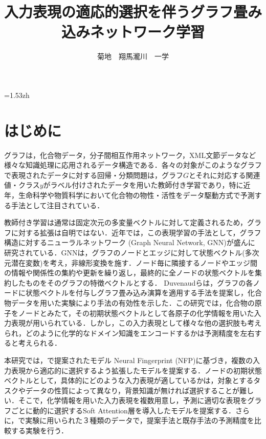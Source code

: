 \documentclass[twocolumn]{jarticle}
\title{\vspace{-4pt}\Large\gt 入力表現の適応的選択を伴うグラフ畳み込みネットワーク学習}
\author{菊地　翔馬\DAG \quad 瀧川　一学\DAG\DDAG\DDDAG\DDDDAG}
\affiliation{\normalsize \DAG 北海道大学大学院情報科学研究科 \quad \DDAG 北海道大学化学反応創成研究拠点\quad \DDDAG 理研AIP \quad \DDDDAG JSTさきがけ}
\begin{document}
\maketitle
\makeetitle   
\baselineskip=1.53zh 

\vspace{-5pt}

\fontsize{9pt}{12pt}\selectfont

\section{はじめに}
グラフは，化合物データ，分子間相互作用ネットワーク，XML文節データなど様々な知識処理に応用されるデータ構造である．各々の対象がこのようなグラフで表現されたデータに対する回帰・分類問題は，グラフ$G$とそれに対応する関連値・クラス$y$がラベル付けされたデータを用いた教師付き学習であり，特に近年，生命科学や物質科学において化合物の物性・活性をデータ駆動方式で予測する手法として注目されている．

教師付き学習は通常は固定次元の多変量ベクトルに対して定義されるため，グラフに対する拡張は自明ではない．近年では，この表現学習の手法として，グラフ構造に対するニューラルネットワーク (Graph Neural Network, GNN)が盛んに研究されている．GNNは，グラフのノードとエッジに対して状態ベクトル(多次元潜在変数)を考え，非線形変換を施す．ノード毎に隣接するノードやエッジ間の情報や関係性の集約や更新を繰り返し，最終的に全ノードの状態ベクトルを集約したものをそのグラフの特徴ベクトルとする\cite{MPNNs}．
Duvenaudらは，グラフの各ノードに状態ベクトルを付与しグラフ畳み込み演算を適用する手法を提案し，化合物データを用いた実験により手法の有効性を示した\cite{NNFP}．この研究では，化合物の原子をノードとみたて，その初期状態ベクトルとして各原子の化学情報を用いた入力表現が用いられている．しかし，この入力表現として様々な他の選択肢も考えられ，どのように化学的なドメイン知識をエンコードするかは予測精度を左右すると考えられる．

本研究では，\cite{NNFP}で提案されたモデル Neural Fingerprint (NFP)に基づき，複数の入力表現から適応的に選択するよう拡張したモデルを提案する．ノードの初期状態ベクトルとして，具体的にどのような入力表現が適しているかは，対象とするタスクやデータの性質によって異なり，背景知識が無ければ選択することが難しい．そこで，化学情報を用いた入力表現を複数用意し，予測に適切な表現をグラフごとに動的に選択するSoft Attention層を導入したモデルを提案する．さらに，\cite{NNFP}で実験に用いられた３種類のデータで，提案手法と既存手法の予測精度を比較する実験を行う．
\end{document}

